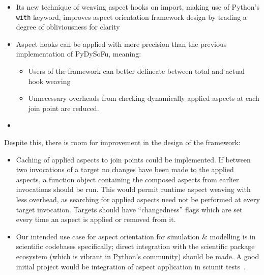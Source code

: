 \begin{itemize}
    \item Its new technique of weaving aspect hooks on import, making use of
    Python's \lstinline{with} keyword, improves aspect orientation framework
    design by trading a degree of obliviousness for clarity
    \item Aspect hooks can be applied with more precision than the previous
    implementation of PyDySoFu, meaning:
        \begin{itemize}
        \item Users of the framework can better delineate between total and
        actual hook weaving
        \item Unnecessary overheads from checking dynamically applied aspects at
        each join point are reduced.
        \end{itemize}
    \item 
\end{itemize}

Despite this, there is room for improvement in the design of the framework:

\begin{itemize}
    \item Caching of applied aspects to join points could be implemented. If
    between two invocations of a target no changes have been made to the applied
    aspects, a function object containing the composed aspects from earlier
    invocations should be run. This would permit runtime aspect weaving with
    less overhead, as searching for applied aspects need not be performed at
    every target invocation. Targets should have ``changedness'' flags which are
    set every time an aspect is applied or removed from it.
    \item Our intended use case for aspect orientation for simulation \&
    modelling is in scientific codebases specifically; direct integration with
    the scientific package ecosystem (which is vibrant in Python's community)
    should be made. A good initial project would be integration of aspect
    application in sciunit tests~\cite{sciunit_primer}.
\end{itemize}

